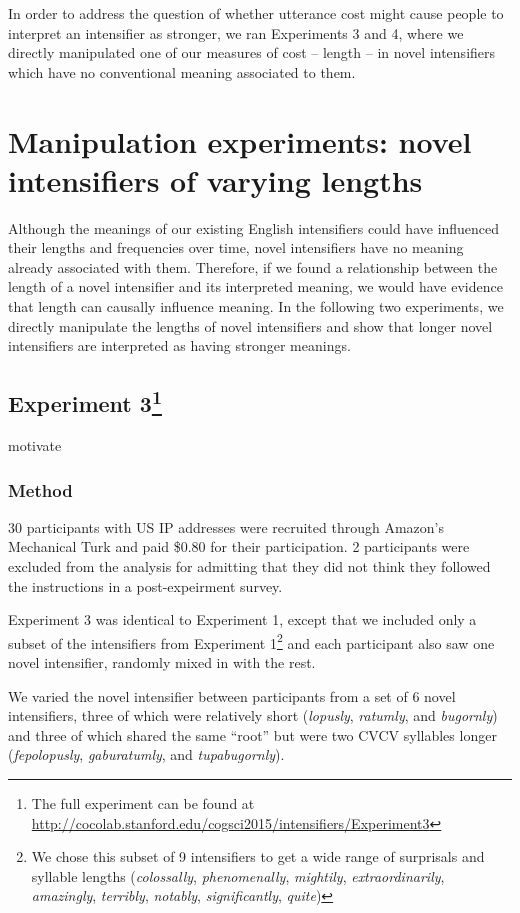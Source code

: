 \documentclass[10pt,letterpaper]{article}
\newcommand{\w}[1]{\emph{#1}}
\newcommand{\todo}[1]{{\color{red}#1}}
\begin{document}
In order to address the question of whether utterance cost might cause people to interpret an intensifier as stronger, we ran Experiments 3 and 4, where we directly manipulated one of our measures of cost -- length -- in novel intensifiers which have no conventional meaning associated to them.

\section{Manipulation experiments: novel intensifiers of varying lengths}

Although the meanings of our existing English intensifiers could have influenced their lengths and frequencies over time, novel intensifiers have no meaning already associated with them. Therefore, if we found a relationship between the length of a novel intensifier and its interpreted meaning, we would have evidence that length can causally influence meaning. In the following two experiments, we directly manipulate the lengths of novel intensifiers and show that longer novel intensifiers are interpreted as having stronger meanings.

\subsection{Experiment 3\footnote{The full experiment can be found at \url{http://cocolab.stanford.edu/cogsci2015/intensifiers/Experiment3}}}
\todo{motivate}

\subsubsection{Method}
30 participants with US IP addresses were recruited through Amazon's Mechanical Turk and paid \$0.80 for their participation. 2 participants were excluded from the analysis for admitting that they did not think they followed the instructions in a post-expeirment survey.

Experiment 3 was identical to Experiment 1, except that we included only a subset of the intensifiers from Experiment 1\footnote{We chose this subset of 9 intensifiers to get a wide range of surprisals and syllable lengths (\w{colossally}, \w{phenomenally}, \w{mightily}, \w{extraordinarily}, \w{amazingly}, \w{terribly}, \w{notably}, \w{significantly}, \w{quite})} and each participant also saw one novel intensifier, randomly mixed in with the rest.

We varied the novel intensifier between participants from a set of 6 novel intensifiers, three of which were relatively short (\w{lopusly}, \w{ratumly}, and \w{bugornly}) and three of which shared the same ``root'' but were two CVCV syllables longer (\w{fepolopusly}, \w{gaburatumly}, and \w{tupabugornly}).
\end{document}
